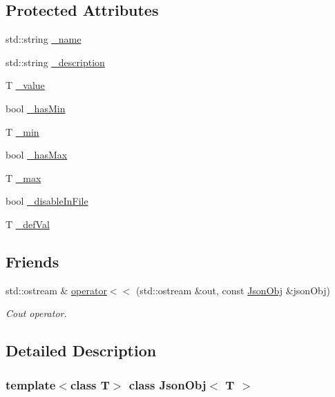 \subsection*{Protected Attributes}
\begin{DoxyCompactItemize}
\item 
std\+::string \hyperlink{class_json_obj_a134e8965a7952fcdfc76d0cec76b1251}{\+\_\+name}
\item 
std\+::string \hyperlink{class_json_obj_a0ab1dd0969845a76f67b199edd1af1d1}{\+\_\+description}
\item 
T \hyperlink{class_json_obj_a93a0b5cd814d2eaea8f7a365410b9007}{\+\_\+value}
\item 
bool \hyperlink{class_json_obj_a15a96894dac79c0070170f1e47808ecd}{\+\_\+has\+Min}
\item 
T \hyperlink{class_json_obj_ac4d168c820d320463dc040ad0f6e8100}{\+\_\+min}
\item 
bool \hyperlink{class_json_obj_a9936d5baf9c30b7ab500bbc311d50997}{\+\_\+has\+Max}
\item 
T \hyperlink{class_json_obj_a8c3b17a54d952923f7197afd4d26d998}{\+\_\+max}
\item 
bool \hyperlink{class_json_obj_a5c945657fed2a1912b0ebdb72c47b810}{\+\_\+disable\+In\+File}
\item 
T \hyperlink{class_json_obj_af268190a877ab77610f43fc498feb564}{\+\_\+def\+Val}
\end{DoxyCompactItemize}
\subsection*{Friends}
\begin{DoxyCompactItemize}
\item 
std\+::ostream \& \hyperlink{class_json_obj_a0f96c923a38dbc3ad58b1964f2a579b4}{operator$<$$<$} (std\+::ostream \&out, const \hyperlink{class_json_obj}{Json\+Obj} \&json\+Obj)
\begin{DoxyCompactList}\small\item\em Cout operator. \end{DoxyCompactList}\end{DoxyCompactItemize}


\subsection{Detailed Description}
\subsubsection*{template$<$class T$>$\newline
class Json\+Obj$<$ T $>$}

